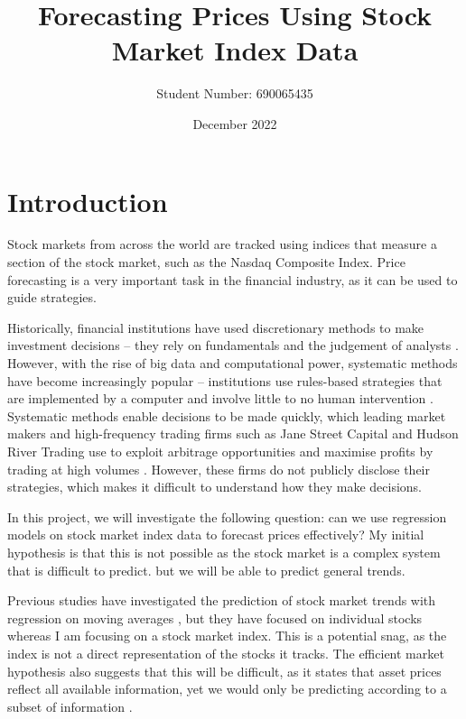 \documentclass[a4paper, 11pt]{article}
\begin{document}
\title{Forecasting Prices Using Stock Market Index Data}
\author{Student Number: 690065435}
\date{December 2022}
\maketitle

\section{Introduction}
Stock markets from across the world are tracked using indices that measure a section of the stock market, such as the Nasdaq Composite Index. Price forecasting is a very important task in the financial industry, as it can be used to guide strategies.

Historically, financial institutions have used discretionary methods to make investment decisions -- they rely on fundamentals and the judgement of analysts \cite{harvey2017man}. However, with the rise of big data and computational power, systematic methods have become increasingly popular -- institutions use rules-based strategies that are implemented by a computer and involve little to no human intervention \cite{harvey2017man}. Systematic methods enable decisions to be made quickly, which leading market makers and high-frequency trading firms such as Jane Street Capital and Hudson River Trading use to exploit arbitrage opportunities and maximise profits by trading at high volumes \cite{aldridge2013high}. However, these firms do not publicly disclose their strategies, which makes it difficult to understand how they make decisions.

In this project, we will investigate the following question: can we use regression models on stock market index data to forecast prices effectively? My initial hypothesis is that this is not possible as the stock market is a complex system that is difficult to predict. but we will be able to predict general trends.

Previous studies have investigated the prediction of stock market trends with regression on moving averages \cite{dinesh2021prediction}, but they have focused on individual stocks whereas I am focusing on a stock market index. This is a potential snag, as the index is not a direct representation of the stocks it tracks. The efficient market hypothesis also suggests that this will be difficult, as it states that asset prices reflect all available information, yet we would only be predicting according to a subset of information \cite{fama1970efficient}. 
\end{document}
